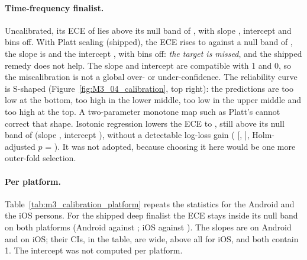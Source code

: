 \paragraph{Time-frequency finalist.}
Uncalibrated, its ECE of  lies above its null band of , with slope , intercept  and  bins off.
With Platt scaling (shipped), the ECE rises to  against a null band of , the slope is  and the intercept , with  bins off: \emph{the target is missed}, and the shipped remedy does not help.
The slope and intercept are compatible with 1 and 0, so the miscalibration is not a global over- or under-confidence.
The reliability curve is S-shaped (Figure~\ref{fig:M3_04_calibration}, top right): the predictions are too low at the bottom, too high in the lower middle, too low in the upper middle and too high at the top.
A two-parameter monotone map such as Platt's cannot correct that shape.
Isotonic regression lowers the ECE to , still above its null band of  (slope , intercept ), without a detectable log-loss gain ( [, ], Holm-adjusted $p$ = ).
It was not adopted, because choosing it here would be one more outer-fold selection.

\paragraph{Per platform.}
Table~\ref{tab:m3_calibration_platform} repeats the statistics for the  Android and the  iOS persons.
For the shipped deep finalist the ECE stays inside its null band on both platforms (Android  against ; iOS  against ).
The slopes are  on Android and  on iOS; their CIs, in the table, are wide, above all for iOS, and both contain 1.
The intercept was not computed per platform.

